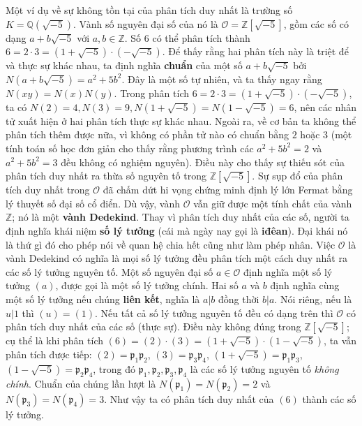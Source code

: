 \begin{multicols}{2}
	Một ví dụ về sự không tồn tại của phân tích duy nhất là trường số $K = \mathbb{Q}(\sqrt{-5})$. Vành số nguyên đại số của nó là $\mathcal{O} = \mathbb{Z}[\sqrt{-5}]$, gồm các số có dạng $a+b\sqrt{-5}$ với $a,b \in \mathbb{Z}$. Số $6$ có thể phân tích thành $6 = 2 \cdot 3 = (1+\sqrt{-5}) \cdot (-\sqrt{-5})$. Để thấy rằng hai phân tích này là triệt để và thực sự khác nhau, ta định nghĩa {\bf\color{duongvaotoanhoc} chuẩn} của một số $a+b\sqrt{-5}$ bởi $N(a+b\sqrt{-5}) = a^2 + 5b^2$. Đây là một số tự nhiên, và ta thấy ngay rằng $N(xy) = N(x)N(y)$. Trong phân tích $6 = 2 \cdot 3 = (1+\sqrt{-5}) \cdot (-\sqrt{-5})$, ta có $N(2) = 4, N(3) = 9, N(1+\sqrt{-5}) = N(1-\sqrt{-5}) = 6$, nên các nhân tử xuất hiện ở hai phân tích thực sự khác nhau.  Ngoài ra, về cơ bản ta không thể phân tích thêm được nữa, vì không có phần tử nào có chuẩn bằng $2$ hoặc $3$ (một tính toán số học đơn giản cho thấy rằng phương trình các $a^2 + 5b^2 = 2$ và $a^2 + 5b^2 = 3$ đều không có nghiệm nguyên). Điều này cho thấy sự thiếu sót của phân tích duy nhất ra thừa số nguyên tố trong $\mathbb{Z}[\sqrt{-5}]$.
	\vskip 0.1cm
	Sự sụp đổ của phân tích duy nhất trong $\mathcal{O}$ đã chấm dứt hi vọng chứng minh định lý lớn Fermat bằng lý thuyết số đại số cổ điển. Dù vậy, vành $\mathcal{O}$ vẫn giữ được một tính chất của vành $\mathbb{Z}$; nó là một {\bf\color{duongvaotoanhoc} vành Dedekind}. Thay vì phân tích duy nhất của các số, người ta định nghĩa khái niệm {\bf\color{duongvaotoanhoc} số lý tưởng} (cái mà ngày nay gọi là {\bf\color{duongvaotoanhoc} iđêan}). Đại khái nó là thứ gì đó cho phép nói về quan hệ chia hết cũng như làm phép nhân. Việc $\mathcal{O}$ là vành Dedekind có nghĩa là mọi số lý tưởng đều phân tích một cách duy nhất ra các số lý tưởng nguyên tố. Một số nguyên đại số $a \in \mathcal{O}$ định nghĩa một số lý tưởng $(a)$, được gọi là một số lý tưởng chính. Hai số $a$ và $b$ định nghĩa cùng một số lý tưởng nếu chúng {\bf\color{duongvaotoanhoc} liên kết}, nghĩa là $a|b$ đồng thời $b|a$. Nói riêng, nếu là $u|1$ thì $(u) = (1)$. Nếu tất cả số lý tưởng nguyên tố đều có dạng trên thì $\mathcal{O}$ có phân tích duy nhất của các số (thực sự). Điều này không đúng trong $\mathbb{Z}[\sqrt{-5}]$; cụ thể là khi phân tích $(6) = (2) \cdot (3) = (1 + \sqrt{-5}) \cdot (1 - \sqrt{-5})$, ta vẫn phân tích được tiếp: $(2) = \mathfrak{p}_1\mathfrak{p}_2$, $(3) = \mathfrak{p}_3\mathfrak{p}_4$, $(1 + \sqrt{-5}) = \mathfrak{p}_1\mathfrak{p}_3$, $(1 - \sqrt{-5}) = \mathfrak{p}_2\mathfrak{p}_4$, trong đó $\mathfrak{p}_1, \mathfrak{p}_2, \mathfrak{p}_3, \mathfrak{p}_4$ là các số lý tưởng nguyên tố {\it không chính}. Chuẩn của chúng lần lượt là $N(\mathfrak{p}_1) = N(\mathfrak{p}_2) = 2$ và $N(\mathfrak{p}_3) = N(\mathfrak{p}_4) = 3$. Như vậy ta có phân tích duy nhất của $(6)$ thành các số lý tưởng.

\end{multicols}
